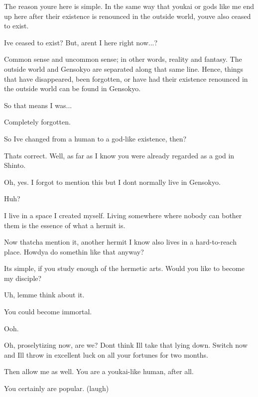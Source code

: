 \begin{tcolorbox}[breakable, colback=white, colframe=black!80,
  boxrule=0.6pt, arc=0mm, left=3mm, right=3mm, top=2mm, bottom=2mm]
\medskip
The reason you\textquotesingle{}re here is simple. In the same way that youkai or gods like me end up here after their existence is renounced in the outside world, you\textquotesingle{}ve also ceased to exist.\par
\medskip
I\textquotesingle{}ve ceased to exist? But, aren\textquotesingle{}t I here right now...?\par
\medskip
Common sense and uncommon sense; in other words, reality and fantasy. The outside world and Gensokyo are separated along that same line. Hence, things that have disappeared, been forgotten, or have had their existence renounced in the outside world can be found in Gensokyo.\par
\medskip
So that means I was...\par
\medskip
Completely forgotten.\par
\medskip
So I\textquotesingle{}ve changed from a human to a god-{}like existence, then?\par
\medskip
That\textquotesingle{}s correct. Well, as far as I know you were already regarded as a god in Shinto.\par
\medskip
Oh, yes. I forgot to mention this but I don\textquotesingle{}t normally live in Gensokyo.\par
\medskip
Huh?\par
\medskip
I live in a space I created myself. Living somewhere where nobody can bother them is the essence of what a hermit is.\par
\medskip
Now thatcha mention it, another hermit I know also lives in a hard-{}to-{}reach place. Howd\textquotesingle{}ya do somethin\textquotesingle{} like that anyway?\par
\medskip
It\textquotesingle{}s simple, if you study enough of the hermetic arts. Would you like to become my disciple?\par
\medskip
Uh, lemme think about it.\par
\medskip
You could become immortal.\par
\medskip
Ooh.\par
\medskip
Oh, proselytizing now, are we? Don\textquotesingle{}t think I\textquotesingle{}ll take that lying down. Switch now and I\textquotesingle{}ll throw in excellent luck on all your fortunes for two months.\par
\medskip
Then allow me as well. You are a youkai-{}like human, after all.\par
\medskip
You certainly are popular. (laugh)\par
\medskip

\end{tcolorbox}
